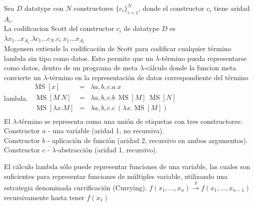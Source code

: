 \begin{defn}\end{defn}
Sea $D$ datatype con $N$ constructores $\{c_i\}_{i=1}^N$, donde el constructor $c_i$ tiene aridad $A_i$. \\
La codificacion Scott del constructor $c_i$ de datatype $D$ es\\
$\lambda x_1 \dots x_{A_i} . \lambda c_1 \ldots c_N . c_i\ x_1 \dots x_{A_i}$\\
Mogensen extiende la codificación de Scott \cite{Mog1994} para codificar cualquier término lambda sin tipo como datos. Esto permite que un $\lambda$-término pueda representarse como datos, dentro de un programa de meta $\lambda$-cálculo donde la funcion meta convierte un $\lambda$-término en la representación de datos correspondiente del término lambda.
$\begin{array}{rcl}
\operatorname{MS}[x] & = & \lambda a, b, c.a\ x \\
\ \operatorname{MS}[M\ N] & = & \lambda a, b, c.b\ \operatorname{MS}[M]\ \operatorname{MS}[N] \\
\ \operatorname{MS}[\lambda x . M] & = & \lambda a, b, c.c\ (\lambda x.\operatorname{MS}[M]) \\
\end{array}$\vspace{0.2cm} \\
El $\lambda$-término se representa como una unión de etiquetas con tres constructores:\\
Constructor $a$ - una variable (aridad 1, no recursiva).\\
Constructor $b$ - aplicación de función (aridad 2, recursivo en ambos argumentos).\\
Constructor $c$ - $\lambda$-abstracción (aridad 1, recursivo).

\begin{note}
El cálculo lambda sólo puede representar funciones de una variable, 
las cuales son suficientes para representar funciones de múltiples variable, utilizando una estrategia denominada currificación (Currying).
$\displaystyle f(x_{1}, \dots, x_n) \xrightarrow{g} f(x_1, \dots, x_{n-1})$ recursivamente hasta tener $f(x_1)$
\end{note}

